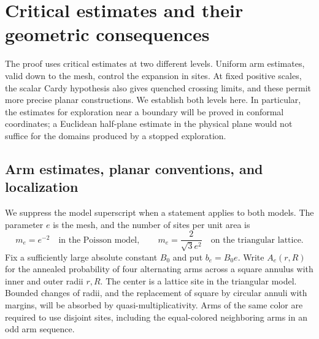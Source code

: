 \section{Critical estimates and their geometric consequences}\label{sec:inputs}

The proof uses critical estimates at two different levels.  Uniform arm
estimates, valid down to the mesh, control the expansion in sites.  At fixed
positive scales, the scalar Cardy hypothesis also gives quenched crossing
limits, and these permit more precise planar constructions.  We establish
both levels here.  In particular, the estimates for exploration near a
boundary will be proved in conformal coordinates; a Euclidean half-plane
estimate in the physical plane would not suffice for the domains produced
by a stopped exploration.

\subsection{Arm estimates, planar conventions, and localization}

We suppress the model superscript when a statement applies to both models.
The parameter $e$ is the mesh, and the number of sites per unit area is
\[
 m_e=e^{-2}\quad\text{in the Poisson model},\qquad
 m_e=\frac{2}{\sqrt3e^2}\quad\text{on the triangular lattice}.
\]
Fix a sufficiently large absolute constant $B_0$ and put $b_e=B_0e$.
Write $A_e(r,R)$ for the annealed probability of four alternating arms
across a square annulus with inner and outer radii $r,R$.  The center is a
lattice site in the triangular model.  Bounded changes of radii, and the
replacement of square by circular annuli with margins, will be absorbed
by quasi-multiplicativity.  Arms of the same color are required to use
disjoint sites, including the equal-colored neighboring arms in an odd
arm sequence.

